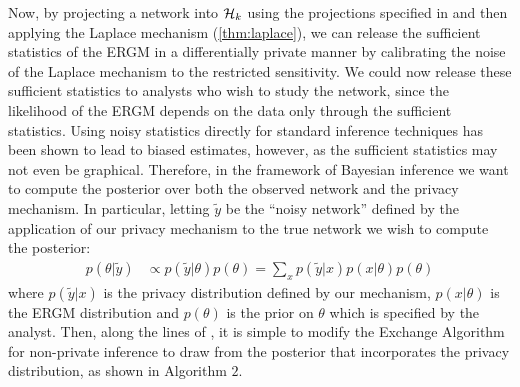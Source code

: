 Now, by projecting a network into $\mathcal{H}_k$ using the projections specified in  and then applying the Laplace mechanism (\ref{thm:laplace}), we can release the sufficient statistics of the ERGM in a differentially private manner by calibrating the noise of the Laplace mechanism to the restricted sensitivity. We could now release these sufficient statistics to analysts who wish to study the network, since the likelihood of the ERGM depends on the data only through the sufficient statistics. Using noisy statistics directly for standard inference techniques has been shown to lead to biased estimates, however, as the sufficient statistics may not even be graphical. Therefore, in the framework of Bayesian inference we want to compute the posterior over both the observed network and the privacy mechanism. In particular, letting $\tilde{y}$ be the ``noisy network'' defined by the application of our privacy mechanism to the true network we wish to compute the posterior:
\begin{align}
p(\theta | \tilde{y}) &\propto p(\tilde{y} | \theta) p(\theta) = \sum_{x} p(\tilde{y} | x) p(x|\theta) p(\theta)  
\end{align}
where $p(\tilde{y} | x)$ is the privacy distribution defined by our mechanism, $p(x| \theta)$ is the ERGM distribution and $p(\theta)$ is the prior on $\theta$ which is specified by the analyst.  Then, along the lines of \cite{LM14}, it is simple to modify the Exchange Algorithm for non-private inference to draw from the posterior that incorporates the privacy distribution, as shown in Algorithm $2$.

